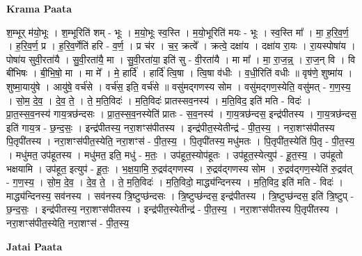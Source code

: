 \documentclass[17pt]{extarticle}
\begin{document}
\textbf{Krama Paata} \newline

श॒म्भूर् म॑यो॒भूः । श॒म्भूरिति॑ शम् - भूः । म॒यो॒भूः स्व॒स्ति । म॒यो॒भूरिति॑ मयः - भूः । स्व॒स्ति मा᳚ । मा॒ ह॒रि॒व॒र्ण॒ । ह॒रि॒व॒र्ण॒ प्र । ह॒रि॒व॒र्णेति॑ हरि - व॒र्ण॒ । प्र च॑र । च॒र॒ क्रत्वे᳚ । क्रत्वे॒ दक्षा॑य । दक्षा॑य रा॒यः । रा॒यस्पोषा॑य । पोषा॑य सुवी॒रता॑यै । सु॒वी॒रता॑यै॒ मा । सु॒वी॒रता॑या॒ इति॑ सु - वी॒रता॑यै । मा मा᳚ । मा॒ रा॒ज॒न्न्॒ । रा॒ज॒न् वि । वि बी॑भिषः । बी॒भि॒षो॒ मा । मा मे᳚ । मे॒ हार्दि॑ । हार्दि॑ त्वि॒षा । त्वि॒षा व॑धीः । व॒धी॒रिति॑ वधीः ॥ वृष॑णे॒ शुष्मा॑य । शुष्मा॒यायु॑षे । आयु॑षे॒ वर्च॑से । वर्च॑स॒ इति॒ वर्च॑से ॥ वसु॑मद्गणस्य सोम । वसु॑मद्गण॒स्येति॒ वसु॑मत् - ग॒ण॒स्य॒ । सो॒म॒ दे॒व॒ । दे॒व॒ ते॒ । ते॒ म॒ति॒विदः॑ । म॒ति॒विदः॑ प्रातस्सव॒नस्य॑ । म॒ति॒विद॒ इति॑ मति - विदः॑ । प्रा॒त॒स्स॒व॒नस्य॑ गाय॒त्रछ॑न्दसः । प्रा॒त॒स्स॒व॒नस्येति॑ प्रातः - स॒व॒नस्य॑ । गा॒य॒त्रछ॑न्दस॒ इन्द्र॑पीतस्य । गा॒य॒त्रछ॑न्दस॒ इति॑ गाय॒त्र - छ॒न्द॒सः॒ । इन्द्र॑पीतस्य॒ नरा॒शꣳस॑पीतस्य । इन्द्र॑पीत॒स्येतीन्द्र॑ - पी॒त॒स्य॒ । नरा॒शꣳस॑पीतस्य पि॒तृपी॑तस्य । नरा॒शꣳस॑पीत॒स्येति॒ नरा॒शꣳस॑ - पी॒त॒स्य॒ । पि॒तृपी॑तस्य॒ मधु॑मतः । पि॒तृपी॑त॒स्येति॑ पि॒तृ - पी॒त॒स्य॒ । मधु॑मत॒ उप॑हूतस्य । मधु॑मत॒ इति॒ मधु॑ - म॒तः॒ । उप॑हूत॒स्योप॑हूतः । उप॑हूत॒स्येत्युप॑ - हू॒त॒स्य॒ । उप॑हूतो भक्षयामि । उप॑हूत॒ इत्युप॑ - हू॒तः॒ । भ॒क्ष॒या॒मि॒ रु॒द्रव॑द्गणस्य । रु॒द्रव॑द्गणस्य सोम । रु॒द्रव॑द्गण॒स्येति॑ रु॒द्रव॑त् - ग॒ण॒स्य॒ । सो॒म॒ दे॒व॒ । दे॒व॒ ते॒ । ते॒ म॒ति॒विदः॑ । म॒ति॒विदो॒ माद्ध्य॑न्दिनस्य । म॒ति॒विद॒ इति॑ मति - विदः॑ । माद्ध्य॑न्दिनस्य॒ सव॑नस्य । सव॑नस्य त्रि॒ष्टुप्छ॑न्दसः । त्रि॒ष्टुप्छ॑न्दस॒ इन्द्र॑पीतस्य । त्रि॒ष्टुप्छ॑न्दस॒ इति॑ त्रि॒ष्टुप् - छ॒न्द॒सः॒ । इन्द्र॑पीतस्य॒ नरा॒शꣳस॑पीतस्य । इन्द्र॑पीत॒स्येतीन्द्र॑ - पी॒त॒स्य॒ । नरा॒शꣳस॑पीतस्य पि॒तृपी॑तस्य । नरा॒शꣳस॑पीत॒स्येति॒ नरा॒शꣳस॑ - पी॒त॒स्य॒ \newline

\textbf{Jatai Paata} \newline
\end{document}
